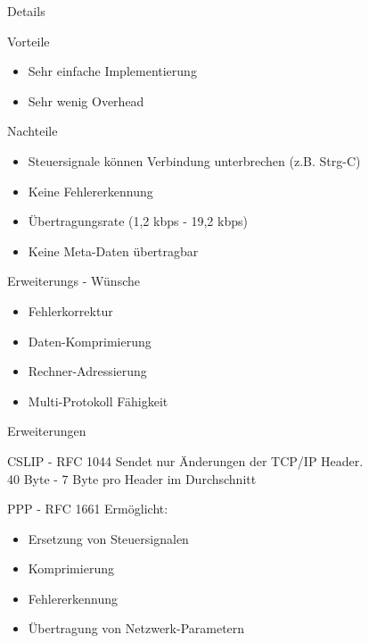 \documentclass[beamer]{uibk}
\begin{document}
\begin{frame}{Details}
  \newpage
  \begin{center}
    
  \end{center}
\end{frame}

\begin{frame}{}
    \begin{block}{Vorteile}
      \begin{itemize}
        \item Sehr einfache Implementierung
        \item Sehr wenig Overhead
      \end{itemize}
    \end{block}

    \begin{alertblock}{Nachteile}
      \begin{itemize}
        \item Steuersignale können Verbindung unterbrechen (z.B. Strg-C)
        \item Keine Fehlererkennung
        \item Übertragungsrate (1,2 kbps - 19,2 kbps)
        \item Keine Meta-Daten übertragbar
      \end{itemize}
    \end{alertblock}

\end{frame}

\begin{frame}{Erweiterungs - Wünsche}
  \begin{itemize}
    \item Fehlerkorrektur
    \item Daten-Komprimierung
    \item Rechner-Adressierung
    \item Multi-Protokoll Fähigkeit
  \end{itemize}
\end{frame}

\begin{frame}{Erweiterungen}
  \begin{block}{CSLIP - RFC 1044}
    Sendet nur Änderungen der TCP/IP Header. \\
    40 Byte - 7 Byte pro Header im Durchschnitt
  \end{block}
  \begin{block}{PPP - RFC 1661}
    Ermöglicht:
    \begin{itemize}
      \item Ersetzung von Steuersignalen
      \item Komprimierung
      \item Fehlererkennung
      \item Übertragung von Netzwerk-Parametern
    \end{itemize}
  \end{block}
\end{frame}
\end{document}
